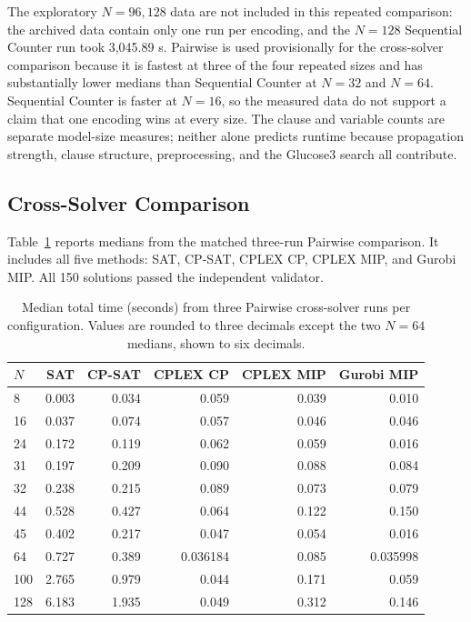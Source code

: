 \documentclass[a4paper,fleqn]{cas-sc}
\begin{document}
The exploratory $N=96,128$ data are not included in this repeated comparison: the archived data contain only one run per encoding, and the $N=128$ Sequential Counter run took 3,045.89 s. Pairwise is used provisionally for the cross-solver comparison because it is fastest at three of the four repeated sizes and has substantially lower medians than Sequential Counter at $N=32$ and $N=64$. Sequential Counter is faster at $N=16$, so the measured data do not support a claim that one encoding wins at every size. The clause and variable counts are separate model-size measures; neither alone predicts runtime because propagation strength, clause structure, preprocessing, and the Glucose3 search all contribute.

\subsection{Cross-Solver Comparison}

Table~\ref{tab:solver-summary} reports medians from the matched three-run Pairwise comparison. It includes all five methods: SAT, CP-SAT, CPLEX CP, CPLEX MIP, and Gurobi MIP. All 150 solutions passed the independent validator.

\begin{table}[width=.99\linewidth,cols=6,pos=ht]
\caption{Median total time (seconds) from three Pairwise cross-solver runs per configuration. Values are rounded to three decimals except the two $N=64$ medians, shown to six decimals.}
\label{tab:solver-summary}
\begin{tabular}{lrrrrr}
\hline
$N$ & SAT & CP-SAT & CPLEX CP & CPLEX MIP & Gurobi MIP \\
\hline
8   & 0.003 & 0.034 & 0.059 & 0.039 & 0.010 \\
16  & 0.037 & 0.074 & 0.057 & 0.046 & 0.046 \\
24  & 0.172 & 0.119 & 0.062 & 0.059 & 0.016 \\
31  & 0.197 & 0.209 & 0.090 & 0.088 & 0.084 \\
32  & 0.238 & 0.215 & 0.089 & 0.073 & 0.079 \\
44  & 0.528 & 0.427 & 0.064 & 0.122 & 0.150 \\
45  & 0.402 & 0.217 & 0.047 & 0.054 & 0.016 \\
64  & 0.727 & 0.389 & 0.036184 & 0.085 & 0.035998 \\
100 & 2.765 & 0.979 & 0.044 & 0.171 & 0.059 \\
128 & 6.183 & 1.935 & 0.049 & 0.312 & 0.146 \\
\hline
\end{tabular}
\end{table}
\end{document}
